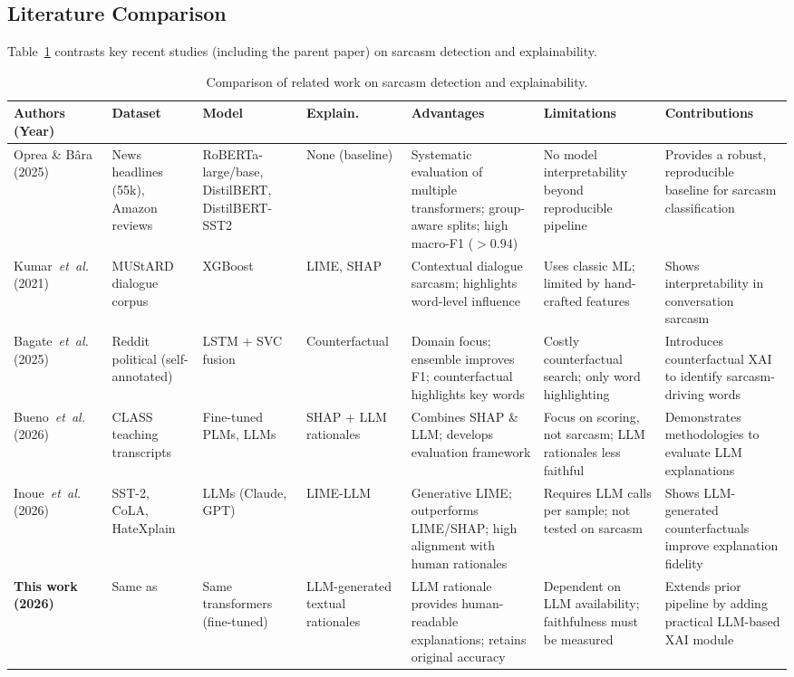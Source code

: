 \subsection{Literature Comparison}\label{subsec:lit_comparison}

Table~\ref{tab:literature_comparison} contrasts key recent studies (including the parent paper) on sarcasm detection and explainability.

\begin{table}
\caption{Comparison of related work on sarcasm detection and explainability.}

\label{tab:literature_comparison}
\begin{tabular}{p{1.9cm} p{2.1cm} p{1.9cm} p{1.5cm} p{2.7cm} p{2.7cm} p{3.2cm}}
\toprule
\textbf{Authors (Year)} & \textbf{Dataset} & \textbf{Model} & \textbf{Explain.} & \textbf{Advantages} & \textbf{Limitations} & \textbf{Contributions} \\
\midrule
Oprea \& B\^{a}ra~\cite{oprea2025llm} (2025) & News headlines (55k), Amazon reviews & RoBERTa-large/base, DistilBERT, DistilBERT-SST2 & None (baseline) & Systematic evaluation of multiple transformers; group-aware splits; high macro-F1 ($>0.94$) & No model interpretability beyond reproducible pipeline & Provides a robust, reproducible baseline for sarcasm classification \\
\midrule
Kumar~\emph{et~al.}~\cite{kumar2021explainable} (2021) & MUStARD dialogue corpus & XGBoost & LIME, SHAP & Contextual dialogue sarcasm; highlights word-level influence & Uses classic ML; limited by hand-crafted features & Shows interpretability in conversation sarcasm \\
\midrule
Bagate~\emph{et~al.}~\cite{bagate2025sarcasm} (2025) & Reddit political (self-annotated) & LSTM + SVC fusion & Counterfactual & Domain focus; ensemble improves F1; counterfactual highlights key words & Costly counterfactual search; only word highlighting & Introduces counterfactual XAI to identify sarcasm-driving words \\
\midrule
Bueno~\emph{et~al.}~\cite{bueno2026scoring} (2026) & CLASS teaching transcripts & Fine-tuned PLMs, LLMs & SHAP + LLM rationales & Combines SHAP \& LLM; develops evaluation framework & Focus on scoring, not sarcasm; LLM rationales less faithful & Demonstrates methodologies to evaluate LLM explanations \\
\midrule
Inoue~\emph{et~al.}~\cite{inoue2026lime} (2026) & SST-2, CoLA, HateXplain & LLMs (Claude, GPT) & LIME-LLM & Generative LIME; outperforms LIME/SHAP; high alignment with human rationales & Requires LLM calls per sample; not tested on sarcasm & Shows LLM-generated counterfactuals improve explanation fidelity \\
\midrule
\textbf{This work (2026)} & Same as~\cite{oprea2025llm} & Same transformers (fine-tuned) & LLM-generated textual rationales & LLM rationale provides human-readable explanations; retains original accuracy & Dependent on LLM availability; faithfulness must be measured & Extends prior pipeline by adding practical LLM-based XAI module \\
\bottomrule
\end{tabular}
\end{table}

